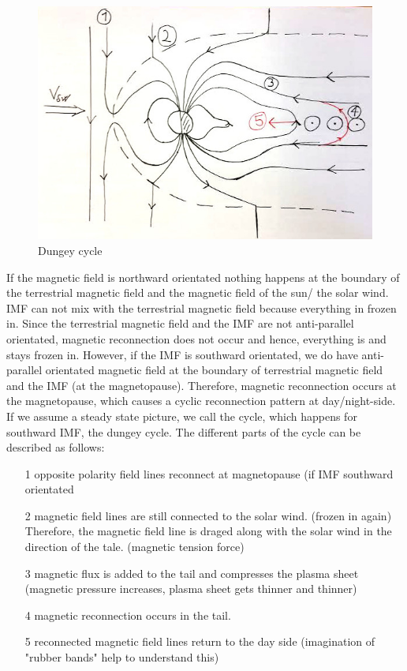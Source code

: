 \documentclass[10pt,a4paper]{article}
\begin{document}
\begin{figure}[h]
\centering
\caption{Dungey cycle}
\label{aurora substorm}
\includegraphics[scale=0.5]{solvind.jpg}
\end{figure}

If the magnetic field is northward orientated nothing happens at the boundary of the terrestrial magnetic field and the magnetic field of the sun/ the solar wind. IMF can not mix with the terrestrial magnetic field because everything in frozen in. Since the terrestrial magnetic field and the IMF are not anti-parallel orientated, magnetic reconnection does not occur and hence, everything is and stays frozen in. 
However, if the IMF is southward orientated, we do have anti-parallel orientated magnetic field at the boundary of terrestrial magnetic field and the IMF (at the magnetopause). Therefore, magnetic reconnection occurs at the magnetopause, which causes a cyclic reconnection pattern at day/night-side. If we assume a steady state picture, we call the cycle, which happens for southward IMF, the dungey cycle. The different parts of the cycle can be described as follows:
\begin{itemize}
\item[1] opposite polarity field lines reconnect at magnetopause (if IMF southward orientated
\item[2] magnetic field lines are still connected to the solar wind. (frozen in again) Therefore, the magnetic field line is draged along with the solar wind in the direction of the tale. (magnetic tension force)
\item[3] magnetic flux is added to the tail and compresses the plasma sheet (magnetic pressure increases, plasma sheet gets thinner and thinner)
\item[4] magnetic reconnection occurs in the tail. 
\item[5] reconnected magnetic field lines return to the day side (imagination of "rubber bands" help to understand this)
\end{itemize}
\end{document}
